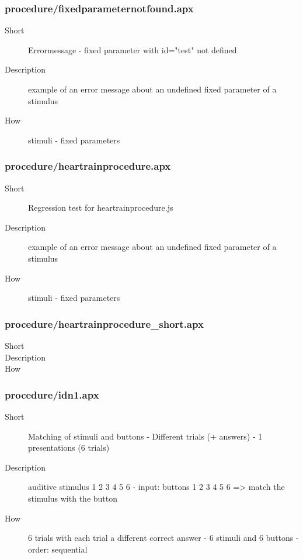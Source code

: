 \subsubsection{procedure/fixedparameternotfound.apx}
\begin{description}
\item[Short] 
 Errormessage - fixed parameter with id="test" not defined
\item[Description] 
 example of an error message about an undefined fixed parameter of a stimulus
\item[How] 
 stimuli - fixed parameters
\end{description}

\subsubsection{procedure/heartrainprocedure.apx}
\begin{description}
\item[Short] 
 Regression test for heartrainprocedure.js
\item[Description] 
 example of an error message about an undefined fixed parameter of a stimulus
\item[How] 
 stimuli - fixed parameters
\end{description}

\subsubsection{procedure/heartrainprocedure\_short.apx}
\begin{description}
\item[Short] 
\item[Description] 
\item[How] 
\end{description}

\subsubsection{procedure/idn1.apx}
\begin{description}
\item[Short] 
 Matching of stimuli and buttons - Different trials (+ answers) - 1 presentations (6 trials)
\item[Description] 
 auditive stimulus 1 2 3 4 5 6 - input: buttons 1 2 3 4 5 6 =\textgreater{} match the stimulus with the button
\item[How] 
 6 trials with each trial a different correct answer - 6 stimuli and 6 buttons - order: sequential
\end{description}

